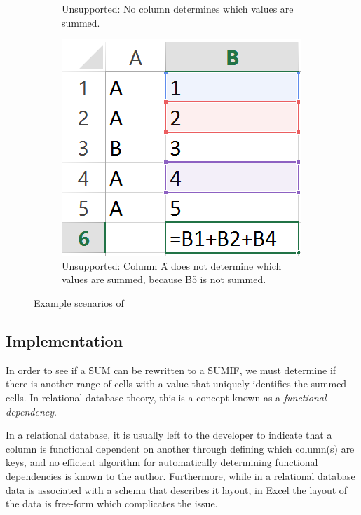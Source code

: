 \begin{figure}
\begin{subfigure}[t]{0.25\textwidth}
	\caption{Unsupported: \newline No column determines which values are summed.}
	\label{fig:introcondaggrScenario2}
\end{subfigure}
\hspace{0.05\textwidth}
\begin{subfigure}[t]{0.25\textwidth}
	\includegraphics[width=\textwidth]{implementation/aggregate/scenario3}
	\caption{Unsupported: \newline Column \f{A} does not determine which values are summed, because \f{B5} is not summed.}
	\label{fig:introcondaggrScenario3}
\end{subfigure}
\caption{Example scenarios of }
\label{fig:introcondaggrScenario}
\end{figure}

\subsection{Implementation}

In order to see if a \f{SUM} can be rewritten to a \f{SUMIF}, we must determine if there is another range of cells with a value that uniquely identifies the summed cells.
In relational database theory, this is a concept known as a \emph{functional dependency}.

In a relational database, it is usually left to the developer to indicate that a column is functional dependent on another through defining which column(s) are keys, and no efficient algorithm for automatically determining functional dependencies is known to the author.
Furthermore, while in a relational database data is associated with a schema that describes it layout, in Excel the layout of the data is free-form which complicates the issue.

